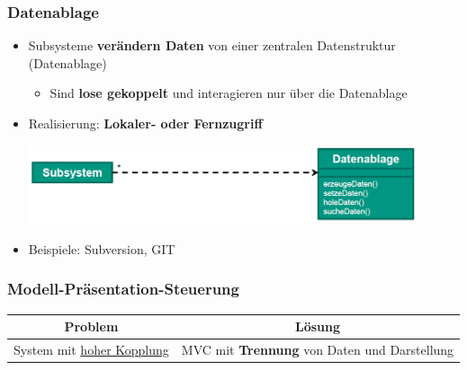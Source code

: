 		\subsubsection{Datenablage}
					
			\begin{itemize}
				\item Subsysteme \textbf{verändern Daten} von einer zentralen Datenstruktur (Datenablage)
				\begin{itemize}
					\item Sind \textbf{lose gekoppelt} und interagieren nur über die Datenablage
				\end{itemize}
				\item Realisierung: \textbf{Lokaler- oder Fernzugriff}
				\begin{center}
					\includegraphics[width=0.9\textwidth]{../images/datenablage.png}
				\end{center}
				\item Beispiele: Subversion, GIT
			\end{itemize}
			
		\subsubsection{Modell-Präsentation-Steuerung}
					
			\begin{center}
				\begin{tabular}{c|c}
					\textbf{Problem}                      & \textbf{Lösung} \\
					\hline
					System mit \underline{hoher Kopplung} & MVC mit \textbf{Trennung} von Daten und Darstellung
				\end{tabular}
			\end{center}
						
